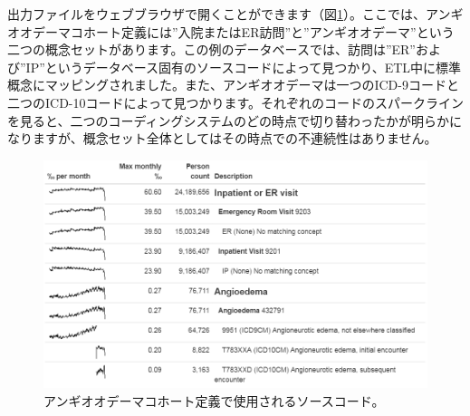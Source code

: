 \documentclass[
  11pt]{book}
\newenvironment{Shaded}{\begin{snugshade}}{\end{snugshade}}
\newcommand{\AttributeTok}[1]{\textcolor[rgb]{0.13,0.29,0.53}{#1}}
\newcommand{\FunctionTok}[1]{\textcolor[rgb]{0.13,0.29,0.53}{\textbf{#1}}}
\newcommand{\NormalTok}[1]{#1}
\newcommand{\OtherTok}[1]{\textcolor[rgb]{0.56,0.35,0.01}{#1}}
\newcommand{\SpecialCharTok}[1]{\textcolor[rgb]{0.81,0.36,0.00}{\textbf{#1}}}
\newcommand{\StringTok}[1]{\textcolor[rgb]{0.31,0.60,0.02}{#1}}
\theoremstyle{definition}
\theoremstyle{definition}
\theoremstyle{definition}
\theoremstyle{definition}
\theoremstyle{remark}
\begin{document}
\begin{Shaded}
\end{Shaded}

出力ファイルをウェブブラウザで開くことができます（図\ref{fig:sourceCodesAngioedema}）。ここでは、アンギオオデーマコホート定義には''入院またはER訪問''と''アンギオオデーマ''という二つの概念セットがあります。この例のデータベースでは、訪問は''ER''および''IP''というデータベース固有のソースコードによって見つかり、ETL中に標準概念にマッピングされました。また、アンギオオデーマは一つのICD-9コードと二つのICD-10コードによって見つかります。それぞれのコードのスパークラインを見ると、二つのコーディングシステムのどの時点で切り替わったかが明らかになりますが、概念セット全体としてはその時点での不連続性はありません。

\begin{figure}

{\centering \includegraphics[width=1\linewidth]{images/DataQuality/sourceCodesAngioedema} 

}

\caption{アンギオオデーマコホート定義で使用されるソースコード。}\label{fig:sourceCodesAngioedema}
\end{figure}
\end{document}
